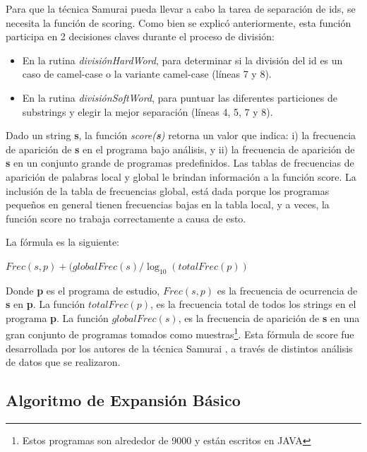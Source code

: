 Para que la técnica Samurai pueda llevar a cabo la tarea de separación de ids, se necesita la función de scoring. Como bien se explicó anteriormente, esta función participa en 2 decisiones claves durante el proceso de división:

\begin{itemize}
\itemsep0em%
\item En la rutina \textit{divisiónHardWord}, para determinar si la división del id es un caso de camel-case o la variante camel-case (líneas 7 y 8).

\item En la rutina \textit{divisiónSoftWord}, para puntuar las diferentes particiones de substrings y elegir la mejor separación (líneas 4, 5, 7 y 8).
\end{itemize}

Dado un string \textbf{s}, la función \textit{score(\textbf{s})} retorna un valor que indica: i) la frecuencia de aparición de \textbf{s} en el programa bajo análisis, y ii) la frecuencia de aparición de \textbf{s} en un conjunto grande de programas predefinidos. Las tablas de frecuencias de aparición de palabras local y global le brindan información a la función score. La inclusión de la tabla de frecuencias global, está dada porque los programas pequeños en general tienen frecuencias bajas en la tabla local, y a veces, la función score no trabaja correctamente a causa de esto.

La fórmula es la siguiente:

\begin{center}
$Frec(s,p) + ( globalFrec(s) / \log_{10}(totalFrec(p) )$
\end{center}

Donde \textbf{p} es el programa de estudio, $Frec(s,p)$ es la frecuencia de ocurrencia de \textbf{s} en \textbf{p}. La función $totalFrec(p)$, es la frecuencia total de todos los strings en el programa \textbf{p}. La función $globalFrec(s)$, es la frecuencia de aparición de \textbf{s} en una gran conjunto de programas tomados como muestras\footnote[1]{Estos programas son alrededor de 9000 y están escritos en JAVA}. Esta fórmula de score fue desarrollada por los autores de la técnica Samurai \cite{EHPV09}, a través de distintos análisis de datos que se realizaron.


\subsection{Algoritmo de Expansión Básico}
\label{sec:algExpBas}

